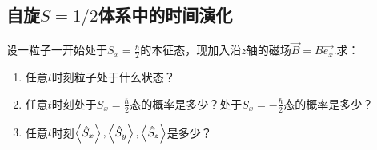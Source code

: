 \subsection{\texorpdfstring{自旋$S=1/2$体系中的时间演化}{自旋S等于1/2体系中的时间演化}}
\begin{question}
    设一粒子一开始处于$S_x=\frac{\hbar}{2}$的本征态，现加入沿$z$轴的磁场$\vec{B}=B\vec{e_x}$.求：
    \begin{enumerate}
        \item 任意$t$时刻粒子处于什么状态？
        \item 任意$t$时刻处于$S_x=\frac{\hbar}{2}$态的概率是多少？处于$S_x=-\frac{\hbar}{2}$态的概率是多少？
        \item 任意$t$时刻$\expval{\hat{S}_x},\expval{\hat{S}_y},\expval{\hat{S}_z}$是多少？
    \end{enumerate}
\end{question}
